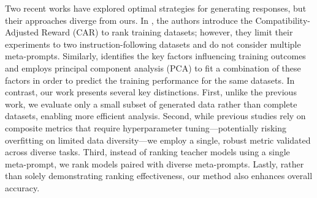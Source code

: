 Two recent works have explored optimal strategies for generating responses, but their approaches diverge from ours. In \citep{xu2024strongermodelsstrongerteachers}, the authors introduce the Compatibility-Adjusted Reward (CAR) to rank training datasets; however, they limit their experiments to two instruction-following datasets and do not consider multiple meta-prompts. Similarly, \citep{kim2024evaluatinglanguagemodelssynthetic} identifies the key factors influencing training outcomes and employs principal component analysis (PCA) to fit a combination of these factors in order to predict the training performance for the same datasets. In contrast, our work presents several key distinctions. First, unlike the previous work, we evaluate only a small subset of generated data rather than complete datasets, enabling more efficient analysis. Second, while previous studies rely on composite metrics that require hyperparameter tuning—potentially risking overfitting on limited data diversity—we employ a single, robust metric validated across diverse tasks. Third, instead of ranking teacher models using a single meta-prompt, we rank models paired with diverse meta-prompts. Lastly, rather than solely demonstrating ranking effectiveness, our method also enhances overall accuracy.